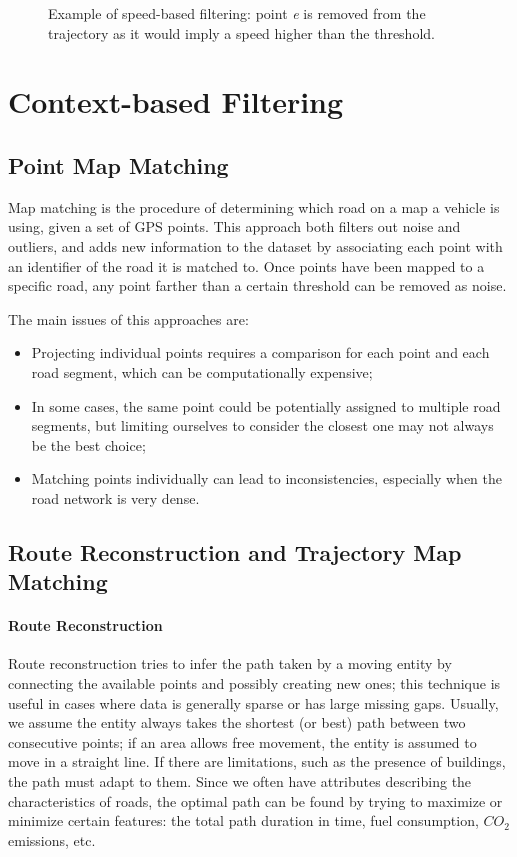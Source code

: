 \begin{figure}[!ht]
    \centering
    
    \caption{Example of speed-based filtering: point \textit{e} is removed from the trajectory as it would imply a speed higher than the threshold.}
    \label{fig:filtering-speed}
\end{figure}

\section{Context-based Filtering}

\subsection{Point Map Matching}

Map matching is the procedure of determining which road on a map a vehicle is using, given a set of GPS points. This approach both filters out noise and outliers, and adds new information to the dataset by associating each point with an identifier of the road it is matched to. Once points have been mapped to a specific road, any point farther than a certain threshold can be removed as noise.

The main issues of this approaches are:
\begin{itemize}
    \item Projecting individual points requires a comparison for each point and each road segment, which can be computationally expensive;
    \item In some cases, the same point could be potentially assigned to multiple road segments, but limiting ourselves to consider the closest one may not always be the best choice;
    \item Matching points individually can lead to inconsistencies, especially when the road network is very dense.
\end{itemize}

\subsection{Route Reconstruction and Trajectory Map Matching}

\paragraph{Route Reconstruction}
Route reconstruction tries to infer the path taken by a moving entity by connecting the available points and possibly creating new ones; this technique is useful in cases where data is generally sparse or has large missing gaps. Usually, we assume the entity always takes the shortest (or best) path between two consecutive points; if an area allows free movement, the entity is assumed to move in a straight line. If there are limitations, such as the presence of buildings, the path must adapt to them. Since we often have attributes describing the characteristics of roads, the optimal path can be found by trying to maximize or minimize certain features: the total path duration in time, fuel consumption, $CO_2$ emissions, etc.

